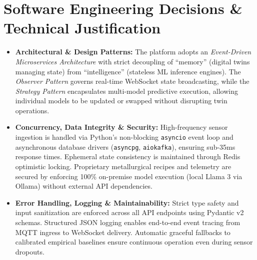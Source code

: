 \documentclass[11pt, a4paper]{article}
\begin{document}
\section{Software Engineering Decisions \& Technical Justification}
\begin{itemize}[noitemsep, topsep=2pt]
    \item \textbf{Architectural \& Design Patterns:} The platform adopts an \textit{Event-Driven Microservices Architecture} with strict decoupling of ``memory'' (digital twins managing state) from ``intelligence'' (stateless ML inference engines). The \textit{Observer Pattern} governs real-time WebSocket state broadcasting, while the \textit{Strategy Pattern} encapsulates multi-model predictive execution, allowing individual models to be updated or swapped without disrupting twin operations.
    \item \textbf{Concurrency, Data Integrity \& Security:} High-frequency sensor ingestion is handled via Python's non-blocking \texttt{asyncio} event loop and asynchronous database drivers (\texttt{asyncpg}, \texttt{aiokafka}), ensuring sub-35ms response times. Ephemeral state consistency is maintained through Redis optimistic locking. Proprietary metallurgical recipes and telemetry are secured by enforcing 100\% on-premise model execution (local Llama 3 via Ollama) without external API dependencies.
    \item \textbf{Error Handling, Logging \& Maintainability:} Strict type safety and input sanitization are enforced across all API endpoints using Pydantic v2 schemas. Structured JSON logging enables end-to-end event tracing from MQTT ingress to WebSocket delivery. Automatic graceful fallbacks to calibrated empirical baselines ensure continuous operation even during sensor dropouts.
\end{itemize}

\end{document}
